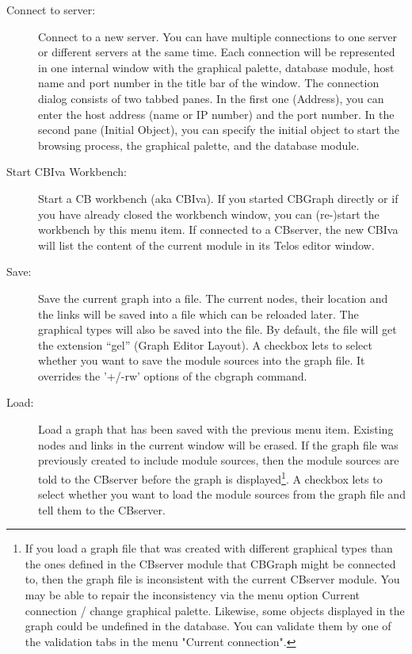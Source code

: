 \begin{description}
\item[Connect to server:] Connect to a new server. You can have
multiple connections to one server or different servers at the same
time. Each connection will be represented in one internal window
with the graphical palette, database module, host name and port number
in the title bar of the window.
The connection dialog consists of two tabbed panes. In the first one
(Address), you can enter the host address (name or IP number) and the
port number. In the second pane (Initial Object), you can specify
the initial object to start the browsing process, the graphical
palette, and the database module.

\item[Start CBIva Workbench:] Start a CB workbench (aka CBIva). If you
started CBGraph directly or if you have already closed
the workbench window, you can (re-)start the workbench by this menu
item. If connected to a CBserver, the new CBIva will list the content
of the current module in its Telos editor window.

\item[Save:] Save the current graph into a file. The current
nodes, their location and the links will be saved into a file which
can be reloaded later. The graphical types will also be saved into the file. 
By default, the file will get the extension ``gel'' (Graph Editor Layout).
A checkbox lets to select whether you want to save the module sources
into the graph file. It overrides the '+/-rw' options of the cbgraph command.

\item[Load:] Load a graph that has been saved with the previous menu
item. Existing nodes and links in the current window will be erased.
If the graph file was previously created to include module sources,
then the module sources are told to the CBserver before the graph is displayed\footnote{
If you load a graph file that was created with different graphical types
than the ones defined in the CBserver module that CBGraph might be connected to,
then the graph file is inconsistent with the current CBserver module.
You may be able to repair the inconsistency via the menu option
Current connection / change graphical palette. Likewise, some objects displayed
in the graph could be undefined in the database. You can validate them by one
of the validation tabs in the menu "Current connection". }.
A checkbox lets to select whether you want to load the module sources from
the graph file and tell them to the CBserver. 


\end{description}
